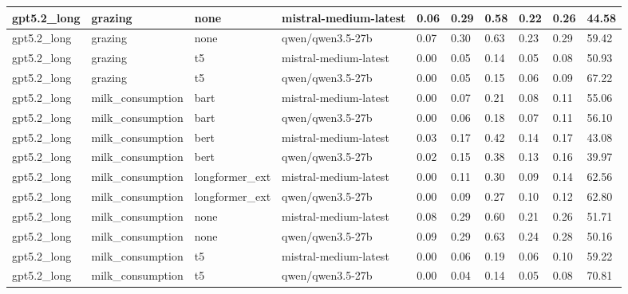 \begin{tabular}{|l|l|l|l|l|l|l|l|l|l|}
 \hline
 gpt5.2\_long & grazing & none & mistral-medium-latest & 0.06 & 0.29 & 0.58 & 0.22 & 0.26 & 44.58 \\
 \hline
 gpt5.2\_long & grazing & none & qwen/qwen3.5-27b & 0.07 & 0.30 & 0.63 & 0.23 & 0.29 & 59.42 \\
 \hline
 gpt5.2\_long & grazing & t5 & mistral-medium-latest & 0.00 & 0.05 & 0.14 & 0.05 & 0.08 & 50.93 \\
 \hline
 gpt5.2\_long & grazing & t5 & qwen/qwen3.5-27b & 0.00 & 0.05 & 0.15 & 0.06 & 0.09 & 67.22 \\
 \hline
 gpt5.2\_long & milk\_consumption & bart & mistral-medium-latest & 0.00 & 0.07 & 0.21 & 0.08 & 0.11 & 55.06 \\
 \hline
 gpt5.2\_long & milk\_consumption & bart & qwen/qwen3.5-27b & 0.00 & 0.06 & 0.18 & 0.07 & 0.11 & 56.10 \\
 \hline
 gpt5.2\_long & milk\_consumption & bert & mistral-medium-latest & 0.03 & 0.17 & 0.42 & 0.14 & 0.17 & 43.08 \\
 \hline
 gpt5.2\_long & milk\_consumption & bert & qwen/qwen3.5-27b & 0.02 & 0.15 & 0.38 & 0.13 & 0.16 & 39.97 \\
 \hline
 gpt5.2\_long & milk\_consumption & longformer\_ext & mistral-medium-latest & 0.00 & 0.11 & 0.30 & 0.09 & 0.14 & 62.56 \\
 \hline
 gpt5.2\_long & milk\_consumption & longformer\_ext & qwen/qwen3.5-27b & 0.00 & 0.09 & 0.27 & 0.10 & 0.12 & 62.80 \\
 \hline
 gpt5.2\_long & milk\_consumption & none & mistral-medium-latest & 0.08 & 0.29 & 0.60 & 0.21 & 0.26 & 51.71 \\
 \hline
 gpt5.2\_long & milk\_consumption & none & qwen/qwen3.5-27b & 0.09 & 0.29 & 0.63 & 0.24 & 0.28 & 50.16 \\
 \hline
 gpt5.2\_long & milk\_consumption & t5 & mistral-medium-latest & 0.00 & 0.06 & 0.19 & 0.06 & 0.10 & 59.22 \\
 \hline
 gpt5.2\_long & milk\_consumption & t5 & qwen/qwen3.5-27b & 0.00 & 0.04 & 0.14 & 0.05 & 0.08 & 70.81 \\
\hline
\end{tabular}
